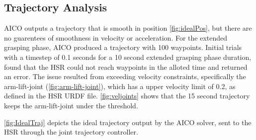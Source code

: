 \documentclass[12pt]{article}
\begin{document}
        \subsection{Trajectory Analysis}
            AICO outputs a trajectory that is smooth in position \cref{fig:idealPos}, but there are no guarentees of smoothness in velocity or acceleration. For the extended grasping phase, AICO produced a trajectory with 100 waypoints. Initial trials with a timestep of 0.1 seconds for a 10 second extended grasping phase duration, found that the HSR could not reach waypoints in the alloted time and returned an error. The issue resulted from exceeding velocity constraints, specifically the arm-lift-joint (\cref{fig:arm-lift-joint}), which has a upper velocity limit of 0.2, as defined in the HSR URDF file. \cref{fig:veljoints} shows that the 15 second trajectory keeps the arm-lift-joint under the threshold.

            \cref{fig:IdealTraj} depicts the ideal trajectory output by the AICO solver, sent to the HSR through the joint trajectory controller.
\end{document}
